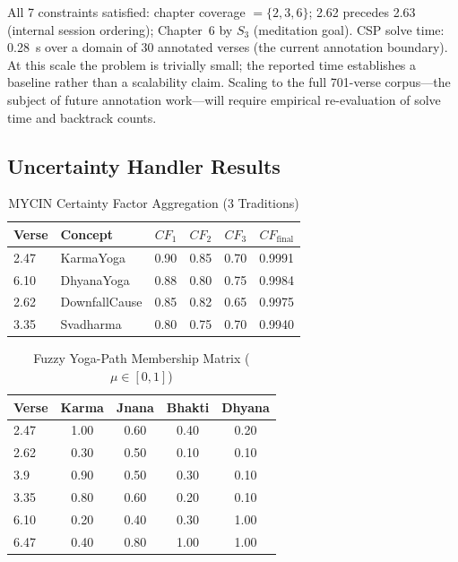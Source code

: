 \documentclass[conference]{IEEEtran}
\begin{document}
All 7 constraints satisfied: chapter coverage $= \{2, 3, 6\}$; 2.62
precedes 2.63 (internal session ordering); Chapter~6 by $S_3$ (meditation
goal). CSP solve time: 0.28~s over a domain of 30 annotated verses
(the current annotation boundary). At this scale the problem is trivially
small; the reported time establishes a baseline rather than a scalability
claim. Scaling to the full 701-verse corpus—the subject of future
annotation work—will require empirical re-evaluation of solve time and
backtrack counts.

\subsection{Uncertainty Handler Results}

\begin{table}[htbp]
\caption{MYCIN Certainty Factor Aggregation (3 Traditions)}
\label{tab:mycin}
\centering
\begin{tabular}{llrrrr}
\toprule
\textbf{Verse} & \textbf{Concept} & $CF_1$ & $CF_2$ & $CF_3$ & $CF_\text{final}$ \\
\midrule
2.47 & KarmaYoga     & 0.90 & 0.85 & 0.70 & 0.9991 \\
6.10 & DhyanaYoga    & 0.88 & 0.80 & 0.75 & 0.9984 \\
2.62 & DownfallCause & 0.85 & 0.82 & 0.65 & 0.9975 \\
3.35 & Svadharma     & 0.80 & 0.75 & 0.70 & 0.9940 \\
\bottomrule
\end{tabular}
\end{table}

\begin{table}[htbp]
\caption{Fuzzy Yoga-Path Membership Matrix ($\mu \in [0,1]$)}
\label{tab:fuzzy}
\centering
\small
\begin{tabular}{lcccc}
\toprule
\textbf{Verse} & \textbf{Karma} & \textbf{Jnana} & \textbf{Bhakti} & \textbf{Dhyana} \\
\midrule
2.47 & 1.00 & 0.60 & 0.40 & 0.20 \\
2.62 & 0.30 & 0.50 & 0.10 & 0.10 \\
3.9  & 0.90 & 0.50 & 0.30 & 0.10 \\
3.35 & 0.80 & 0.60 & 0.20 & 0.10 \\
6.10 & 0.20 & 0.40 & 0.30 & 1.00 \\
6.47 & 0.40 & 0.80 & 1.00 & 1.00 \\
\bottomrule
\end{tabular}
\end{table}
\end{document}
